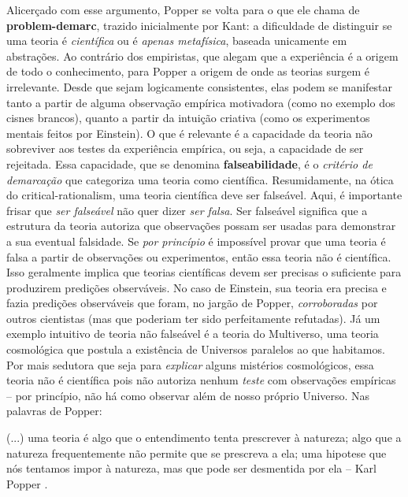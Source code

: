\documentclass[./main.tex]{subfiles}
\begin{document}
\par Alicerçado com esse argumento, Popper se volta para o que ele chama de \textbf{\gls{problem-demarc}}, trazido inicialmente por Kant: a dificuldade de distinguir se uma \gls{teoria} é \textit{científica} ou é \textit{apenas metafísica}, baseada unicamente em abstrações. Ao contrário dos empiristas, que alegam que a experiência é a origem de todo o conhecimento, para Popper a origem de onde as teorias surgem é irrelevante. Desde que sejam logicamente consistentes, elas podem se manifestar tanto a partir de alguma observação empírica motivadora (como no exemplo dos cisnes brancos), quanto a partir da intuição criativa (como os experimentos mentais feitos por Einstein). O que é relevante é a capacidade da \gls{teoria} não sobreviver aos testes da experiência empírica, ou seja, a capacidade de ser rejeitada. Essa capacidade, que se denomina \textbf{\gls{falseabilidade}}, é o \textit{critério de demarcação} que categoriza uma \gls{teoria} como científica. Resumidamente, na ótica do \gls{critical-rationalism}, uma \gls{teoria} científica deve ser falseável. Aqui, é importante frisar que \textit{ser falseável }não quer dizer \textit{ser falsa}. Ser falseável significa que a estrutura da \gls{teoria} autoriza que observações possam ser usadas para demonstrar a sua eventual falsidade. Se \textit{por princípio} é impossível provar que uma \gls{teoria} é falsa a partir de observações ou experimentos, então essa \gls{teoria} não é científica. Isso geralmente implica que teorias científicas devem ser precisas o suficiente para produzirem predições observáveis. No caso de Einstein, sua \gls{teoria} era precisa e fazia predições observáveis que foram, no jargão de Popper, \textit{corroboradas} por outros cientistas (mas que poderiam ter sido perfeitamente refutadas). Já um exemplo intuitivo de \gls{teoria} não falseável é a \gls{teoria} do Multiverso, uma \gls{teoria} cosmológica que postula a existência de Universos paralelos ao que habitamos. Por mais sedutora que seja para \textit{explicar} alguns mistérios cosmológicos, essa \gls{teoria} não é científica pois não autoriza nenhum \textit{teste} com observações empíricas – por princípio, não há como observar além de nosso próprio Universo. Nas palavras de Popper: 

\begin{adjustwidth}{100pt}{0pt}
\medskip
\small (...) uma \gls{teoria} é algo que o entendimento tenta prescrever à natureza; algo que a natureza frequentemente não permite que se prescreva a ela; uma \gls{hipotese} que nós tentamos impor à natureza, mas que pode ser desmentida por ela -- Karl Popper \cite{popper2013dois}.
\medskip
\end{adjustwidth}
\end{document}

